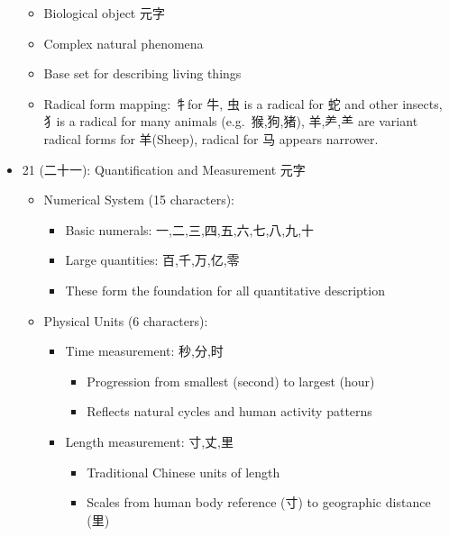 \documentclass[
  11pt,
  letterpaper,
]{article}
\providecommand{\tightlist}{%
  \setlength{\itemsep}{0pt}\setlength{\parskip}{0pt}}
\begin{document}
\begin{itemize}
  \begin{itemize}
  \tightlist
  \item
    Biological object 元字
  \item
    Complex natural phenomena
  \item
    Base set for describing living things
  \item
    Radical form mapping: 牜for 牛, 虫 is a radical for 蛇 and other
    insects, 犭is a radical for many animals (e.g.~猴,狗,猪), 羊,⺶,⺷
    are variant radical forms for 羊(Sheep), radical for 马 appears
    narrower.
  \end{itemize}
\item
  21 (二十一): Quantification and Measurement 元字

  \begin{itemize}
  \tightlist
  \item
    Numerical System (15 characters):

    \begin{itemize}
    \tightlist
    \item
      Basic numerals: 一,二,三,四,五,六,七,八,九,十
    \item
      Large quantities: 百,千,万,亿,零
    \item
      These form the foundation for all quantitative description
    \end{itemize}
  \item
    Physical Units (6 characters):

    \begin{itemize}
    \tightlist
    \item
      Time measurement: 秒,分,时

      \begin{itemize}
      \tightlist
      \item
        Progression from smallest (second) to largest (hour)
      \item
        Reflects natural cycles and human activity patterns
      \end{itemize}
    \item
      Length measurement: 寸,丈,里

      \begin{itemize}
      \tightlist
      \item
        Traditional Chinese units of length
      \item
        Scales from human body reference (寸) to geographic distance
        (里)
      \end{itemize}
    \end{itemize}
  \end{itemize}
\end{itemize}
\end{document}
